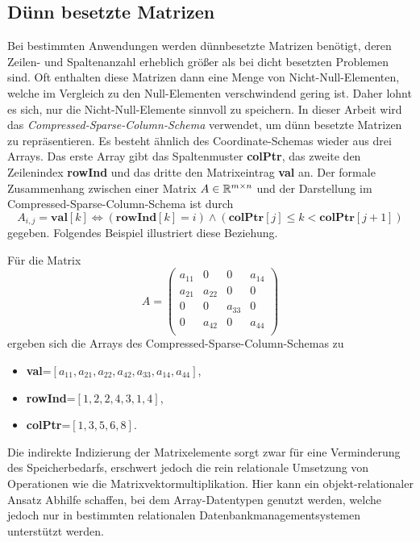 \subsection*{Dünn besetzte Matrizen}
Bei bestimmten Anwendungen werden dünnbesetzte Matrizen benötigt, deren Zeilen- und Spaltenanzahl erheblich größer als bei dicht besetzten Problemen sind. Oft enthalten diese Matrizen dann eine Menge von Nicht-Null-Elementen, welche im Vergleich zu den Null-Elementen verschwindend gering ist. Daher lohnt es sich, nur die Nicht-Null-Elemente sinnvoll zu speichern. In dieser Arbeit wird das \textit{Compressed-Sparse-Column-Schema}\cite{duff1989sparse} verwendet, um dünn besetzte Matrizen zu repräsentieren. Es besteht ähnlich des Coordinate-Schemas wieder aus drei Arrays. Das erste Array gibt das Spaltenmuster \textbf{colPtr}, das zweite den Zeilenindex \textbf{rowInd} und das dritte den Matrixeintrag \textbf{val} an. Der formale Zusammenhang zwischen einer Matrix $A \in \mathbb{R}^{m \times n}$ und der Darstellung im Compressed-Sparse-Column-Schema ist durch 
\begin{equation*}
    A_{i,j}=\mathbf{val}[k] \Leftrightarrow (\mathbf{rowInd}[k]=i) \wedge (\mathbf{colPtr}[j] \leq k < \mathbf{colPtr}[j+1])
\end{equation*} 
gegeben. Folgendes Beispiel illustriert diese Beziehung.
\begin{bsp}
    Für die Matrix
    \begin{equation*}
        A=\begin{pmatrix}
            a_{11} &0 &0 &a_{14} \\
            a_{21} &a_{22} &0 &0 \\
            0 &0 &a_{33} &0 \\
            0 &a_{42} &0 &a_{44} \\
        \end{pmatrix}
    \end{equation*}
    ergeben sich die Arrays des Compressed-Sparse-Column-Schemas zu
    \begin{itemize}
        \item \textbf{val}=$[a_{11}, a_{21}, a_{22}, a_{42}, a_{33}, a_{14}, a_{44}]$,
        \item \textbf{rowInd}=$[1, 2, 2, 4, 3, 1, 4]$,
        \item \textbf{colPtr}=$[1, 3, 5, 6, 8]$.
    \end{itemize}
\end{bsp}
Die indirekte Indizierung der Matrixelemente sorgt zwar für eine Verminderung des Speicherbedarfs, erschwert jedoch die rein relationale Umsetzung von Operationen wie die Matrixvektormultiplikation. Hier kann ein objekt-relationaler Ansatz Abhilfe schaffen, bei dem Array-Datentypen genutzt werden, welche jedoch nur in bestimmten relationalen Datenbankmanagementsystemen unterstützt werden. 

